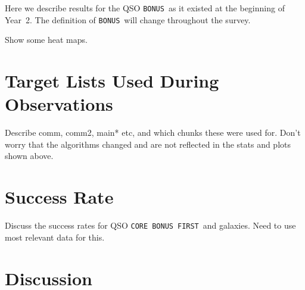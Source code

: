 \documentclass[12pt,preprint]{aastex}
\newcommand{\core}{\texttt{CORE}}
\newcommand{\bonus}{\texttt{BONUS}}
\newcommand{\first}{\texttt{FIRST}}
\begin{document}
Here we describe results for the QSO \bonus\ as it existed at the beginning
of Year~2.  The definition of \bonus\ will change throughout the survey.

Show some heat maps.


\section{Target Lists Used During Observations}

Describe comm, comm2, main* etc, and which chunks these were used for.  Don't
worry that the algorithms changed and are not reflected in the stats and plots
shown above.

\section{Success Rate}

Discuss the success rates for QSO \core\, \bonus\, \first\ and galaxies.
Need to use most relevant data for this.

\section{Discussion}
\end{document}

